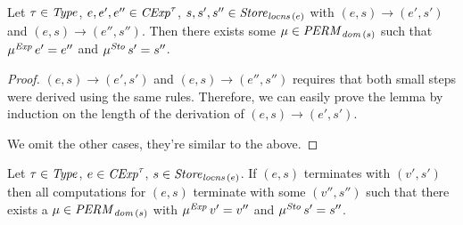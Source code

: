 \documentclass[12pt,a4paper]{report}
\newcommand{\CExp}{\nstyle{CExp}}
\newcommand{\Sto}{\nstyle{Sto}}
\newcommand{\PERM}{\nstyle{PERM}}
\begin{document}
\begin{lemma} \label{lemma:Existance_of_permutations_for_small_steps}
  Let $\tau\in\mathit{Type}$, $e,e',e''\in\CExp^\tau$, $s,s',s''\in\mathit{Store}_{\mathit{locns}\,(e)}$ with
  $(e,s) \to (e',s')$ and $(e,s) \to (e'',s'')$. Then there exists some $\mu \in \PERM_{\dom{s}}$
  such that $\mu^{\mathit{Exp}}\,e' = e''$ and $\mu^\Sto\,s' = s''$.
\end{lemma}

\begin{proof}
  $(e,s) \to (e',s')$ and $(e,s) \to (e'',s'')$ requires that both small steps were derived
  using the same rules. Therefore, we can easily prove the lemma by induction on the length
  of the derivation of $(e,s) \to (e',s')$.
  We omit the other cases, they're similar to the above.
\end{proof}

\begin{corollary}
  Let $\tau\in\mathit{Type}$, $e\in\CExp^\tau$, $s\in\mathit{Store}_{\mathit{locns}\,(e)}$.
  If $(e,s)$ terminates with $(v',s')$ then all computations for $(e,s)$ terminate with some
  $(v'',s'')$ such that there exists a $\mu \in \PERM_{\dom{s}}$ with
  $\mu^{\mathit{Exp}}\,v' = v''$ and $\mu^\Sto\,s' = s''$.
\end{corollary}
\end{document}
